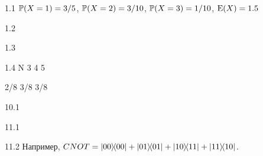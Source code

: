 \protect \hypertarget {soln:1.1}{}
\begin{solution}{{1.1}}
  $\P(X=1)=3/5$, $\P(X=2)=3/10$, $\P(X=3)=1/10$, $\E(X)=1.5$
\end{solution}
\protect \hypertarget {soln:1.2}{}
\begin{solution}{{1.2}}
\end{solution}
\protect \hypertarget {soln:1.3}{}
\begin{solution}{{1.3}}
\end{solution}
\protect \hypertarget {soln:1.4}{}
\begin{solution}{{1.4}}
   N 3 4 5

  2/8 3/8 3/8
\end{solution}
\protect \hypertarget {soln:10.1}{}
\begin{solution}{{10.1}}
  
\end{solution}
\protect \hypertarget {soln:11.1}{}
\begin{solution}{{11.1}}
  
\end{solution}
\protect \hypertarget {soln:11.2}{}
\begin{solution}{{11.2}}
  Например, $CNOT = \ketbra{00}{00} + \ketbra{01}{01} + \ketbra{10}{11} + \ketbra{11}{10}$.
\end{solution}
